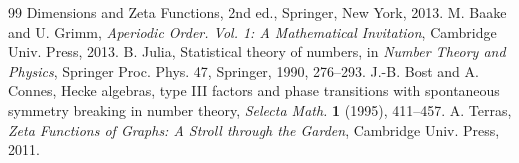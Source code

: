 \documentclass[11pt]{article}
\theoremstyle{remark}
\begin{document}
\begin{thebibliography}{99}
{Dimensions and Zeta Functions}, 2nd ed., Springer, New York, 2013.
 M. Baake and U. Grimm, \emph{Aperiodic Order. Vol. 1: A Mathematical
Invitation}, Cambridge Univ. Press, 2013.
 B. Julia, Statistical theory of numbers, in \emph{Number Theory and Physics},
Springer Proc. Phys. 47, Springer, 1990, 276--293.
 J.-B. Bost and A. Connes, Hecke algebras, type III factors and phase
transitions with spontaneous symmetry breaking in number theory, \emph{Selecta Math.} \textbf{1}
(1995), 411--457.
 A. Terras, \emph{Zeta Functions of Graphs: A Stroll through the Garden}, Cambridge
Univ. Press, 2011.
\end{thebibliography}
\end{document}
